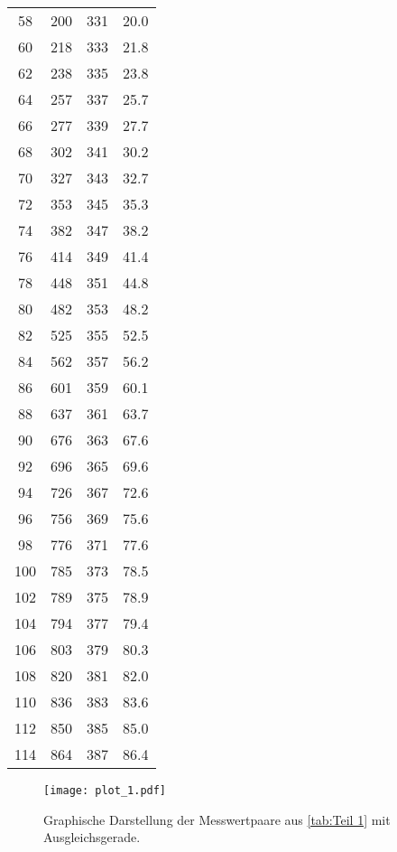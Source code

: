 \begin{longtable}{S[table-format=3.0] S[table-format=3.0] | S[table-format=3.0] S[table-format=2.1]}
    58  & 200 & 331 & 20.0 \\
    60  & 218 & 333 & 21.8 \\
    62  & 238 & 335 & 23.8 \\
    64  & 257 & 337 & 25.7 \\
    66  & 277 & 339 & 27.7 \\
    68  & 302 & 341 & 30.2 \\
    70  & 327 & 343 & 32.7 \\
    72  & 353 & 345 & 35.3 \\
    74  & 382 & 347 & 38.2 \\
    76  & 414 & 349 & 41.4 \\
    78  & 448 & 351 & 44.8 \\
    80  & 482 & 353 & 48.2 \\
    82  & 525 & 355 & 52.5 \\
    84  & 562 & 357 & 56.2 \\
    86  & 601 & 359 & 60.1 \\
    88  & 637 & 361 & 63.7 \\
    90  & 676 & 363 & 67.6 \\
    92  & 696 & 365 & 69.6 \\
    94  & 726 & 367 & 72.6 \\
    96  & 756 & 369 & 75.6 \\
    98  & 776 & 371 & 77.6 \\
    100 & 785 & 373 & 78.5 \\
    102 & 789 & 375 & 78.9 \\
    104 & 794 & 377 & 79.4 \\
    106 & 803 & 379 & 80.3 \\
    108 & 820 & 381 & 82.0 \\
    110 & 836 & 383 & 83.6 \\
    112 & 850 & 385 & 85.0 \\
    114 & 864 & 387 & 86.4 \\ 
\end{longtable}

\begin{figure}
  \centering
  \texttt{[image: plot\_1.pdf]}
  \caption{Graphische Darstellung der Messwertpaare aus \autoref{tab:Teil 1} mit Ausgleichsgerade.}
  \label{fig:Verdampfungswärme}
\end{figure}


